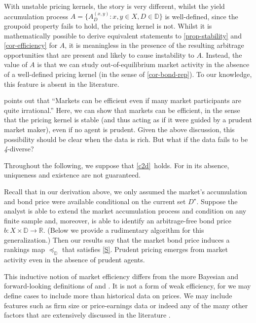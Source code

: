 \documentclass[ecta,nameyear,draft]{econsocart}
\newcommand{\R}{\mathbb R}
\newcommand{\mbbd}{{\mathds D}}
\newcommand{\past}{{D^\star}}
\newcommand{\xy}{{(x, y)}}
\newcommand{\stability}{\ref{S}}
\theoremstyle{plain}
\theoremstyle{remark}
\begin{document}
With unstable pricing kernels, the story is very different, whilst the yield
accumulation process $A = \{A^{\xy}_D : x, y \in X, D \in \mbbd\}$ is
well-defined, since the groupoid property fails to hold, the pricing kernel is
not. Whilst it is mathematically possible to derive equivalent statements to
\cref{prop-stability} and \cref{cor-efficiency} for $A$, it is
meaningless in the presence of the resulting arbitrage opportunities that are
present and likely to cause instability to $A$.  Instead, the value of $A$ is
that we can study out-of-equilibrium market activity in the absence of a
well-defined pricing kernel (in the sense of \cref{cor-bond-rep}). To our
knowledge, this feature is absent in the literature.

 points out that ``Markets can be efficient
even if many market participants are quite irrational.'' Here, we can show that
markets can be efficient, in the sense that the pricing kernel is stable (and
thus acting as if it were guided by a prudent market maker), even if no agent
is prudent. Given the above discussion, this possibility should be clear when
the data is rich.  But what if the data fails to be \emph{4}-diverse?

Throughout the following, we suppose that \ref{c2d}\ holds. For in its
absence, uniqueness and existence are not guaranteed.

Recall that in our derivation above, we only assumed the market's accumulation
and bond price were available conditional on the current set $\past$. Suppose
the analyst is able to extend the market accumulation process and condition on
any finite sample and, moreover, is able to identify an arbitrage-free bond
price $b: X \times \mbbd \rightarrow \R$. (Below we provide a rudimentary
algorithm for this generalization.) Then our results say that the market bond
price induces a rankings map $\preceq_{\mbbd}$ that satisfies \stability.
Prudent pricing emerges from market activity even in the absence of prudent
agents.

This inductive notion of market efficiency differs from the more Bayesian and
forward-looking definitions of \citet{fama1970efficient} and
\citet{malkiel2003efficient}. It is not a form of weak efficiency, for we may
define cases to include more than historical data on prices. We may include
features such as firm size or price-earnings data or indeed any of the many
other factors that are extensively discussed in the literature
\citep{fama2015five,harvey2021lucky,gu2020empirical}.
\end{document}
